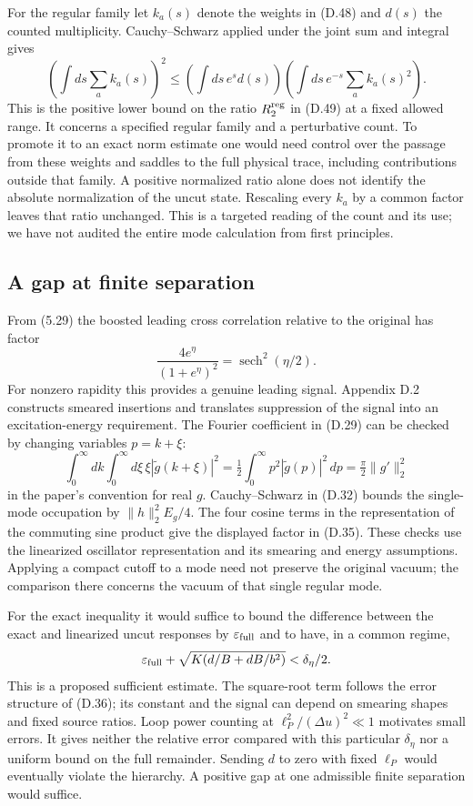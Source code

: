 \documentclass[11pt]{article}
\begin{document}
For the regular family let $k_a(s)$ denote the weights in (D.48) and $d(s)$ the counted multiplicity. Cauchy--Schwarz applied under the joint sum and integral gives
\[
 \left(\int ds\sum_a k_a(s)\right)^2
 \le \left(\int ds\, e^s d(s)\right)
     \left(\int ds\,e^{-s}\sum_a k_a(s)^2\right).
\]
This is the positive lower bound on the ratio $R_2^{\rm reg}$ in (D.49) at a fixed allowed range. It concerns a specified regular family and a perturbative count. To promote it to an exact norm estimate one would need control over the passage from these weights and saddles to the full physical trace, including contributions outside that family. A positive normalized ratio alone does not identify the absolute normalization of the uncut state. Rescaling every $k_a$ by a common factor leaves that ratio unchanged. This is a targeted reading of the count and its use; we have not audited the entire mode calculation from first principles.

\subsection{A gap at finite separation}
From (5.29) the boosted leading cross correlation relative to the original has factor
\[
 \frac{4e^\eta}{(1+e^\eta)^2}=\operatorname{sech}^2(\eta/2).
\]
For nonzero rapidity this provides a genuine leading signal. Appendix D.2 constructs smeared insertions and translates suppression of the signal into an excitation-energy requirement. The Fourier coefficient in (D.29) can be checked by changing variables $p=k+\xi$:
\[
 \int_0^\infty dk\int_0^\infty d\xi\,\xi|\widetilde g(k+\xi)|^2
 =\tfrac12\int_0^\infty p^2|\widetilde g(p)|^2\,dp
 =\tfrac{\pi}{2}\|g'\|_2^2
\]
in the paper's convention for real $g$. Cauchy--Schwarz in (D.32) bounds the single-mode occupation by $\|h\|_2^2 E_g/4$. The four cosine terms in the representation of the commuting sine product give the displayed factor in (D.35). These checks use the linearized oscillator representation and its smearing and energy assumptions. Applying a compact cutoff to a mode need not preserve the original vacuum; the comparison there concerns the vacuum of that single regular mode.

For the exact inequality it would suffice to bound the difference between the exact and linearized uncut responses by $\varepsilon_{\rm full}$ and to have, in a common regime,
\[
 \varepsilon_{\rm full}+\sqrt{K(d/B+dB/b^2)}<\delta_\eta/2 .
\]
This is a proposed sufficient estimate. The square-root term follows the error structure of (D.36); its constant and the signal can depend on smearing shapes and fixed source ratios. Loop power counting at $\ell_P^2/(\Delta u)^2\ll1$ motivates small errors. It gives neither the relative error compared with this particular $\delta_\eta$ nor a uniform bound on the full remainder. Sending $d$ to zero with fixed $\ell_P$ would eventually violate the hierarchy. A positive gap at one admissible finite separation would suffice.
\end{document}
